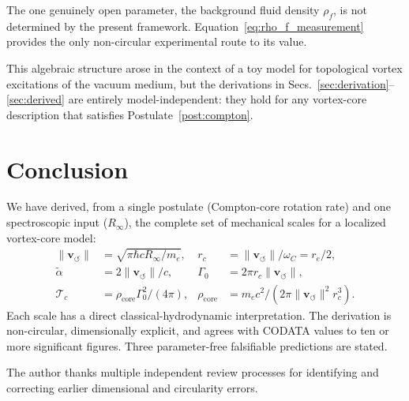 \documentclass[aps,pra,preprint,longbibliography,nofootinbib]{revtex4-2}
\newcommand{\vnorm}{\lVert\mathbf{v}_{\!\boldsymbol{\circlearrowleft}}\rVert} %
\newcommand{\rhof}{\rho_{\!f}}                   %
\newcommand{\rhocore}{\rho_{\mathrm{core}}}      %
\newcommand{\rc}{r_c}                            %
\newcommand{\omC}{\omega_C}                      %
\newcommand{\Rinf}{R_\infty}                     %
\newcommand{\Tc}{\mathcal{T}_c}                  %
\newcommand{\Gz}{\Gamma_0}                       %
\begin{document}
The one genuinely open parameter, the background fluid density $\rhof$,
is not determined by the present framework.
Equation~\eqref{eq:rho_f_measurement} provides the only
non-circular experimental route to its value.

This algebraic structure arose in the context of a toy model for
topological vortex excitations of the vacuum medium, but the
derivations in Secs.~\ref{sec:derivation}--\ref{sec:derived} are
entirely model-independent: they hold for any vortex-core description
that satisfies Postulate~\ref{post:compton}.

\section{Conclusion}
\label{sec:conclusion}

We have derived, from a single postulate (Compton-core rotation rate)
and one spectroscopic input ($\Rinf$), the complete set of mechanical
scales for a localized vortex-core model:
\begin{align*}
  \vnorm  &= \sqrt{\pi\hbar c\Rinf/m_e},
  &\rc    &= \vnorm/\omC = r_e/2, \\
  \tilde\alpha &= 2\vnorm/c,
  &\Gz    &= 2\pi\rc\vnorm, \\
  \Tc     &= \rhocore\Gz^2/(4\pi),
  &\rhocore &= m_ec^2/(2\pi\vnorm^2\rc^3).
\end{align*}
Each scale has a direct classical-hydrodynamic interpretation.
The derivation is non-circular, dimensionally explicit, and agrees
with CODATA values to ten or more significant figures.
Three parameter-free falsifiable predictions are stated.

\begin{acknowledgments}
The author thanks multiple independent review processes for
identifying and correcting earlier dimensional and circularity errors.
\end{acknowledgments}
\end{document}
